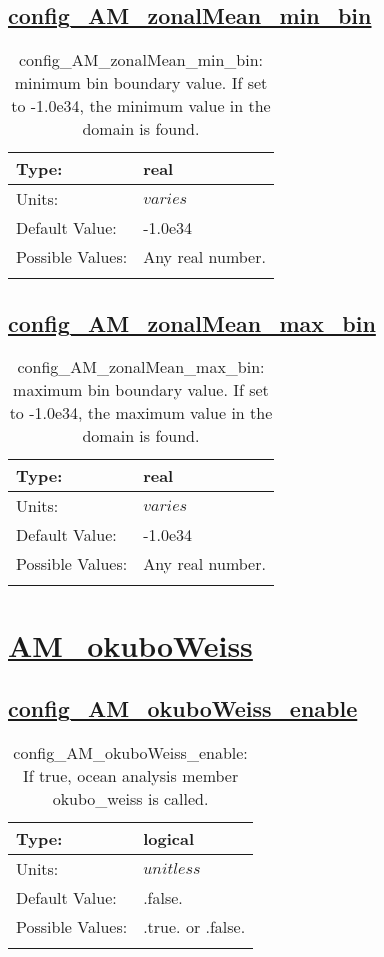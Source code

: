 \subsection[config\_AM\_zonalMean\_min\_bin]{\hyperref[sec:nm_tab_AM_zonalMean]{config\_AM\_zonalMean\_min\_bin}}
\label{subsec:nm_sec_config_AM_zonalMean_min_bin}
\begin{center}
\begin{longtable}{| p{2.0in} || p{4.0in} |}
    \hline
    Type: & real \\
    \hline
    Units: & $varies$ \\
    \hline
    Default Value: & -1.0e34 \\
    \hline
    Possible Values: & Any real number. \\
    \hline
    \caption{config\_AM\_zonalMean\_min\_bin: minimum bin boundary value.  If set to -1.0e34, the minimum value in the domain is found.}
\end{longtable}
\end{center}
\subsection[config\_AM\_zonalMean\_max\_bin]{\hyperref[sec:nm_tab_AM_zonalMean]{config\_AM\_zonalMean\_max\_bin}}
\label{subsec:nm_sec_config_AM_zonalMean_max_bin}
\begin{center}
\begin{longtable}{| p{2.0in} || p{4.0in} |}
    \hline
    Type: & real \\
    \hline
    Units: & $varies$ \\
    \hline
    Default Value: & -1.0e34 \\
    \hline
    Possible Values: & Any real number. \\
    \hline
    \caption{config\_AM\_zonalMean\_max\_bin: maximum bin boundary value.  If set to -1.0e34, the maximum value in the domain is found.}
\end{longtable}
\end{center}
\section[AM\_okuboWeiss]{\hyperref[sec:nm_tab_AM_okuboWeiss]{AM\_okuboWeiss}}
\label{sec:nm_sec_AM_okuboWeiss}
\subsection[config\_AM\_okuboWeiss\_enable]{\hyperref[sec:nm_tab_AM_okuboWeiss]{config\_AM\_okuboWeiss\_enable}}
\label{subsec:nm_sec_config_AM_okuboWeiss_enable}
\begin{center}
\begin{longtable}{| p{2.0in} || p{4.0in} |}
    \hline
    Type: & logical \\
    \hline
    Units: & $unitless$ \\
    \hline
    Default Value: & .false. \\
    \hline
    Possible Values: & .true. or .false. \\
    \hline
    \caption{config\_AM\_okuboWeiss\_enable: If true, ocean analysis member okubo\_weiss is called.}
\end{longtable}
\end{center}
